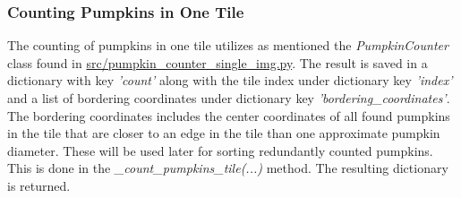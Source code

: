 \documentclass[../Head/Main.tex]{subfiles}
\begin{document}
\subsubsection{Counting Pumpkins in One Tile}
The counting of pumpkins in one tile utilizes as mentioned the \textit{PumpkinCounter} class found in \url{src/pumpkin\_counter\_single\_img.py}. The result is saved in a dictionary with key \textit{'count'} along with the tile index under dictionary key \textit{'index'} and a list of bordering coordinates under dictionary key \textit{'bordering\_coordinates'}. The bordering coordinates includes the center coordinates of all found pumpkins in the tile that are closer to an edge in the tile than one approximate pumpkin diameter. These will be used later for sorting redundantly counted pumpkins.\\
This is done in the \textit{\_count\_pumpkins\_tile(...)} method. The resulting dictionary is returned.
\end{document}
